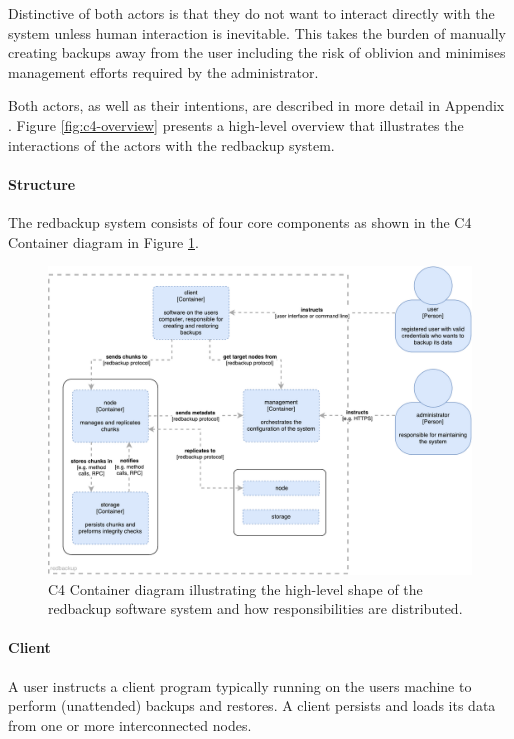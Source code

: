 Distinctive of both actors is that they do not want to interact directly with the system unless human interaction is inevitable. This takes the burden of manually creating backups away from the user including the risk of oblivion and minimises management efforts required by the administrator.  

Both actors, as well as their intentions, are described in more detail in Appendix . Figure \ref{fig:c4-overview} presents a high-level overview that illustrates the interactions of the actors with the redbackup system.

\paragraph{Structure}
The redbackup system consists of four core components as shown in the C4 Container diagram in Figure \ref{fig:c4-container}.

\begin{figure}[h]
	\centering
	\includegraphics[width=1\linewidth]{resources/c4-container}
	\caption[C4 Container Diagram]{C4 Container diagram illustrating the high-level shape of the redbackup software system and how responsibilities are distributed.}
	\label{fig:c4-container}
\end{figure}

\paragraph{Client} A \gls{user} instructs a \gls{client} program typically running on the users machine to perform (unattended) backups and restores.  A \gls{client} persists and loads its data from one or more interconnected \glspl{node}.

